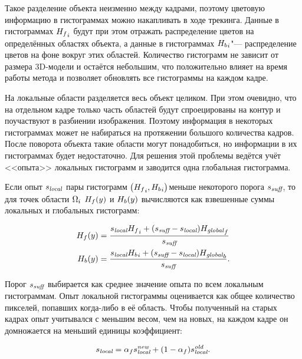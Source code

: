 Такое разделение объекта неизменно между кадрами, поэтому цветовую информацию
в гистограммах можно накапливать в ходе трекинга.
Данные в гистограммах ${H_f}_i$ будут при этом отражать распределение
цветов на определённых областях объекта, а данные в гистограммах
${H_b}_i$"--- распределение цветов на фоне вокруг этих областей.
Количество гистограмм не зависит от размера 3D-модели и остаётся небольшим, что
положительно влияет на время работы метода и позволяет обновлять все гистограммы
на каждом кадре.

На локальные области разделяется весь объект целиком.
При этом очевидно, что на отдельном кадре только часть областей будут
спроецированы на контур и поучаствуют в разбиении изображения.
Поэтому информация в некоторых гистограммах может не набираться на протяжении
большого количества кадров.
После поворота объекта такие области могут понадобиться, но информации в
их гистограммах будет недостаточно.
Для решения этой проблемы ведётся учёт <<опыта>> локальных гистограмм и
заводится одна глобальная гистограмма.

Если опыт $s_{\text{\it local}}$ пары гистограмм $\left( {H_f}_i,
{H_b}_i \right)$меньше некоторого порога
$s_{\text{\it suff}}$, то для точек области $\Omega_i$ $H_f(y)$ и $H_b(y)$
вычисляются как взвешенные суммы локальных и глобальных гистограмм:

\begin{align}
\label{eqn:histo_skill}
H_f(y) &= \dfrac{s_{\text{\it local}} {H_f}_i + (s_{\text{\it suff}} -
s_{\text{\it local}})
        {H_{\text {\it global}}}_f}{s_{\text{\it suff}}} \\
H_b(y) &= \dfrac{s_{\text{\it local}} {H_b}_i + (s_{\text{\it suff}} -
s_{\text{\it local}})
        {H_{\text {\it global}}}_b}{s_{\text{\it suff}}}
\text{.}
\end{align}

Порог $s_{\text{\it suff}}$ выбирается как среднее значение опыта по всем
локальным гистограммам.
Опыт локальной гистограммы оценивается как общее количество пикселей, попавших
когда-либо в её область.
Чтобы полученный на старых кадрах опыт учитывался с меньшим весом, чем на
новых, на каждом кадре он домножается на меньший единицы коэффициент:

\begin{equation}
s_{\text{\it local}} = \alpha_f s_{\text{\it local}}^{\text{\it new}} + (1 -
\alpha_f) s_{\text{\it local}}^{\text{\it old}}
\text{.}
\end{equation}

